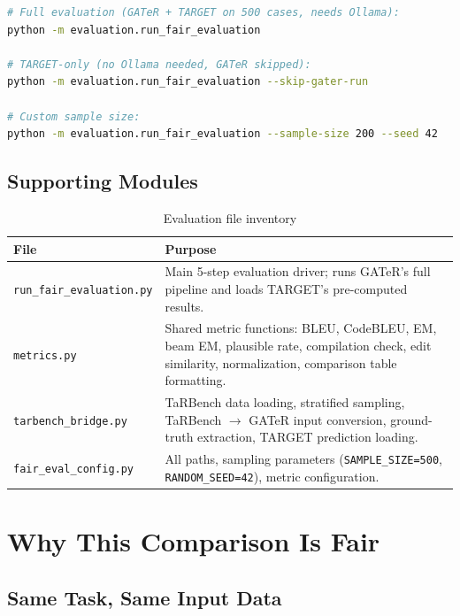\documentclass[11pt,a4paper]{article}
\begin{document}
\begin{lstlisting}[language=bash,caption={Running the evaluation}]
# Full evaluation (GATeR + TARGET on 500 cases, needs Ollama):
python -m evaluation.run_fair_evaluation

# TARGET-only (no Ollama needed, GATeR skipped):
python -m evaluation.run_fair_evaluation --skip-gater-run

# Custom sample size:
python -m evaluation.run_fair_evaluation --sample-size 200 --seed 42
\end{lstlisting}

\subsection{Supporting Modules}

\begin{table}[h]
\centering
\caption{Evaluation file inventory}
\begin{tabular}{@{}lp{8.5cm}@{}}
\toprule
\textbf{File} & \textbf{Purpose} \\
\midrule
\texttt{run\_fair\_evaluation.py}
    & Main 5-step evaluation driver; runs GATeR's full pipeline
      and loads TARGET's pre-computed results. \\
\texttt{metrics.py}
    & Shared metric functions: BLEU, CodeBLEU, EM, beam EM,
      plausible rate, compilation check, edit similarity,
      normalization, comparison table formatting. \\
\texttt{tarbench\_bridge.py}
    & TaRBench data loading, stratified sampling, TaRBench $\to$
      GATeR input conversion, ground-truth extraction, TARGET
      prediction loading. \\
\texttt{fair\_eval\_config.py}
    & All paths, sampling parameters (\texttt{SAMPLE\_SIZE=500},
      \texttt{RANDOM\_SEED=42}), metric configuration. \\
\bottomrule
\end{tabular}
\end{table}

\section{Why This Comparison Is Fair}
\label{sec:fairness}

\subsection{Same Task, Same Input Data}
\end{document}
